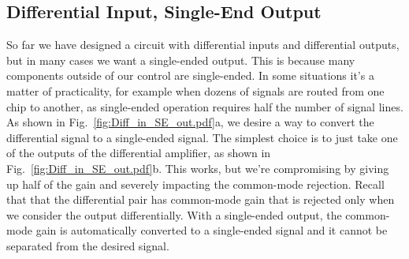 \subsection{Differential Input, Single-End Output}
So far we have designed a circuit with differential inputs and differential outputs, but in many cases we want a single-ended output.  This is because many components outside of our control are single-ended.  In some situations it's a matter of practicality, for example when dozens of signals are routed from one chip to another, as single-ended operation requires half the number of signal lines.  As shown in Fig.~\ref{fig:Diff_in_SE_out.pdf}a, we desire a way to convert the differential signal to a single-ended signal.  The simplest choice is to just take one of the outputs of the differential amplifier, as shown in Fig.~\ref{fig:Diff_in_SE_out.pdf}b.   This works, but we're compromising by giving up half of the gain and severely impacting the common-mode rejection.  Recall that that the differential pair has common-mode gain that is rejected only when we consider the output differentially.  With a single-ended output, the common-mode gain is automatically converted to a single-ended signal and it cannot be separated from the desired signal.
